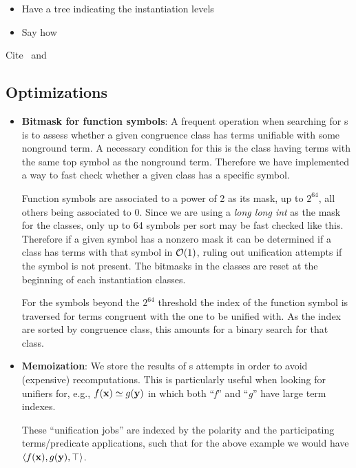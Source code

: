 \message{ !name(main.tex)}\documentclass{easychair}
\begin{document}

\begin{itemize}
  \item Have a tree indicating the instantiation levels
  \item Say how
\end{itemize}

Cite~\cite{Leino2005} and~

\subsection{Optimizations}
\label{sec:optimizations}

\begin{itemize}
  \item \textbf{Bitmask for function symbols}: A frequent operation
  when searching for {\eunif}s is to assess whether a given congruence
  class has terms unifiable with some nonground term. A necessary
  condition for this is the class having terms with the same top
  symbol as the nonground term. Therefore we have implemented a way to
  fast check whether a given class has a specific symbol.

  Function symbols are associated to a power of 2 as its mask, up to
  $2^{64}$, all others being associated to $0$. Since we are using a
  \emph{long long int} as the mask for the classes, only up to 64
  symbols per sort may be fast checked like this. Therefore if a given
  symbol has a nonzero mask it can be determined if a class has terms
  with that symbol in $\mathcal{O}(1)$, ruling out unification attempts if the
  symbol is not present. The bitmasks in the classes are reset at the
  beginning of each instantiation classes.

  For the symbols beyond the $2^{64}$ threshold the index of the
  function symbol is traversed for terms congruent with the one to be
  unified with. As the index are sorted by congruence class, this
  amounts for a binary search for that class.

  \item \textbf{Memoization}: We store the results of {\euni}s
  attempts in order to avoid (expensive) recomputations. This is
  particularly useful when looking for unifiers for, e.g.,
  $\bfapp{x}\simeq \bfapp[g]{y}$ in which both ``\emph{f}'' and
  ``\emph{g}'' have large term indexes.

  These ``unification jobs'' are indexed by the polarity and the participating
  terms/predicate applications, such that for the above example we
  would have $\langle\bfapp{x}, \bfapp[g]{y}, \top\rangle$.
\end{itemize}
\end{document}
